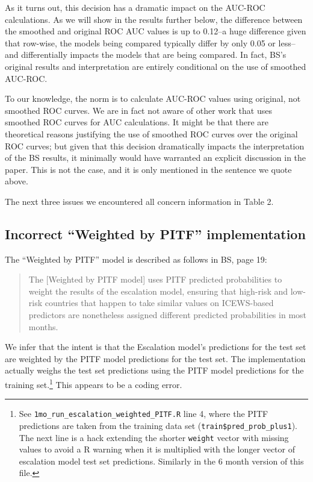 \documentclass[]{article}
\let\rmarkdownfootnote\footnote%
\def\footnote{\protect\rmarkdownfootnote}
\begin{document}
As it turns out, this decision has a dramatic impact on the AUC-ROC
calculations. As we will show in the results further below, the
difference between the smoothed and original ROC AUC values is up to
0.12--a huge difference given that row-wise, the models being compared
typically differ by only 0.05 or less--and differentially impacts the
models that are being compared. In fact, BS's original results and
interpretation are entirely conditional on the use of smoothed AUC-ROC.

To our knowledge, the norm is to calculate AUC-ROC values using
original, not smoothed ROC curves. We are in fact not aware of other
work that uses smoothed ROC curves for AUC calculations. It might be
that there are theoretical reasons justifying the use of smoothed ROC
curves over the original ROC curves; but given that this decision
dramatically impacts the interpretation of the BS results, it minimally
would have warranted an explicit discussion in the paper. This is not
the case, and it is only mentioned in the sentence we quote above.

The next three issues we encountered all concern information in Table 2.

\hypertarget{incorrect-weighted-by-pitf-implementation}{%
\subsection{Incorrect ``Weighted by PITF''
implementation}\label{incorrect-weighted-by-pitf-implementation}}

The ``Weighted by PITF'' model is described as follows in BS, page 19:

\begin{quote}
The {[}Weighted by PITF model{]} uses PITF predicted probabilities to
weight the results of the escalation model, ensuring that high-risk and
low-risk countries that happen to take similar values on ICEWS-based
predictors are nonetheless assigned different predicted probabilities in
most months.
\end{quote}

We infer that the intent is that the Escalation model's predictions for
the test set are weighted by the PITF model predictions for the test
set. The implementation actually weighs the test set predictions using
the PITF model predictions for the training set.\footnote{See
  \texttt{1mo\_run\_escalation\_weighted\_PITF.R} line 4, where the PITF
  predictions are taken from the training data set
  (\texttt{train\$pred\_prob\_plus1}). The next line is a hack extending
  the shorter \texttt{weight} vector with missing values to avoid a R
  warning when it is multiplied with the longer vector of escalation
  model test set predictions. Similarly in the 6 month version of this
  file.} This appears to be a coding error.
\end{document}
